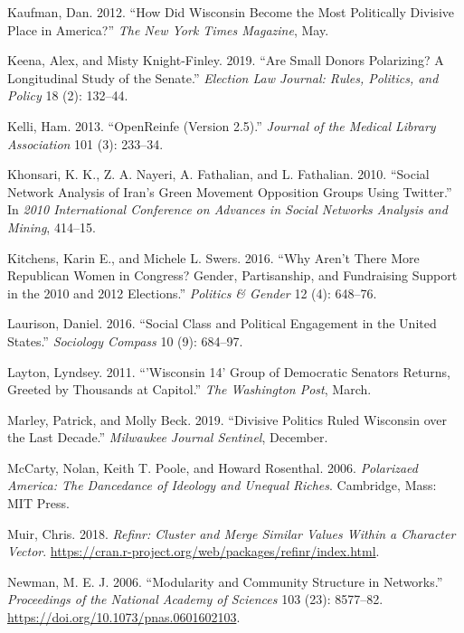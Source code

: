 \documentclass[12pt,]{article}
\begin{document}
\leavevmode\hypertarget{ref-kaufman2012}{}%
Kaufman, Dan. 2012. ``How Did Wisconsin Become the Most Politically
Divisive Place in America?'' \emph{The New York Times Magazine}, May.

\leavevmode\hypertarget{ref-keena2019}{}%
Keena, Alex, and Misty Knight-Finley. 2019. ``Are Small Donors
Polarizing? A Longitudinal Study of the Senate.'' \emph{Election Law
Journal: Rules, Politics, and Policy} 18 (2): 132--44.

\leavevmode\hypertarget{ref-openrefine}{}%
Kelli, Ham. 2013. ``OpenReinfe (Version 2.5).'' \emph{Journal of the
Medical Library Association} 101 (3): 233--34.

\leavevmode\hypertarget{ref-khonsari2010}{}%
Khonsari, K. K., Z. A. Nayeri, A. Fathalian, and L. Fathalian. 2010.
``Social Network Analysis of Iran's Green Movement Opposition Groups
Using Twitter.'' In \emph{2010 International Conference on Advances in
Social Networks Analysis and Mining}, 414--15.

\leavevmode\hypertarget{ref-kitchens2016}{}%
Kitchens, Karin E., and Michele L. Swers. 2016. ``Why Aren't There More
Republican Women in Congress? Gender, Partisanship, and Fundraising
Support in the 2010 and 2012 Elections.'' \emph{Politics \& Gender} 12
(4): 648--76.

\leavevmode\hypertarget{ref-laurison2016}{}%
Laurison, Daniel. 2016. ``Social Class and Political Engagement in the
United States.'' \emph{Sociology Compass} 10 (9): 684--97.

\leavevmode\hypertarget{ref-layton2011}{}%
Layton, Lyndsey. 2011. ``'Wisconsin 14' Group of Democratic Senators
Returns, Greeted by Thousands at Capitol.'' \emph{The Washington Post},
March.

\leavevmode\hypertarget{ref-marley2019}{}%
Marley, Patrick, and Molly Beck. 2019. ``Divisive Politics Ruled
Wisconsin over the Last Decade.'' \emph{Milwaukee Journal Sentinel},
December.

\leavevmode\hypertarget{ref-mccarty2006}{}%
McCarty, Nolan, Keith T. Poole, and Howard Rosenthal. 2006.
\emph{Polarizaed America: The Dancedance of Ideology and Unequal
Riches}. Cambridge, Mass: MIT Press.

\leavevmode\hypertarget{ref-refinr}{}%
Muir, Chris. 2018. \emph{Refinr: Cluster and Merge Similar Values Within
a Character Vector}.
\url{https://cran.r-project.org/web/packages/refinr/index.html}.

\leavevmode\hypertarget{ref-newman2006}{}%
Newman, M. E. J. 2006. ``Modularity and Community Structure in
Networks.'' \emph{Proceedings of the National Academy of Sciences} 103
(23): 8577--82. \url{https://doi.org/10.1073/pnas.0601602103}.
\end{document}
